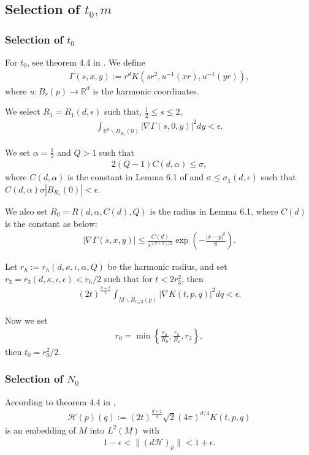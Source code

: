 \subsection{Selection of \texorpdfstring{$t_0, m$}{t0, m}}

\subsubsection{Selection of \texorpdfstring{$t_0$}{t0}}
For $t_0$, see theorem 4.4 in \cite{portegies2016embeddings}.
We define 
\begin{align}
	\Gamma(s,x,y) := r^d K(sr^2, u^{-1}(xr),u^{-1}(yr)),
\end{align}
where $u : B_r(p) \rightarrow \mathbb{R}^d$ is the harmonic coordinates.

We select $R_1 = R_1(d,\epsilon)$ such that, $\frac{1}{2}\leq s \leq 2$, 
\begin{align}
	\int_{\mathbb{R}^d \backslash B_{R_1}(0)} |\nabla \Gamma(s,0,y)|^2 dy < \epsilon.
\end{align}

We set $\alpha=\frac{1}{2}$ and $Q>1$ such that 
\begin{align}
	2(Q-1)C(d,\alpha) \leq \sigma,
\end{align}
where $C(d,\alpha)$ is the constant in Lemma 6.1 of \cite{portegies2016embeddings} and $\sigma \leq \sigma_1(d,\epsilon)$ such that $C(d,\alpha)\sigma |B_{R_1}(0)| < \epsilon$.

We also set $R_0=R(d,\alpha, C(d),Q)$ is the radius in Lemma 6.1, where $C(d)$ is the constant as below:
\begin{align}
	|\nabla\Gamma(s,x,y)| \leq \frac{C(d)}{s^{(d+1)/2}}\exp\left(-\frac{|x-y|^2}{8}\right).
\end{align}

Let $r_h := r_h(d,\kappa,\iota,\alpha,Q)$ be the harmonic radius, and set $r_3 = r_3(d,\kappa,\iota,\epsilon)< r_h/2$ such that for $t< 2r_3^2$, then
\begin{align}
	(2t)^{\frac{d+2}{2}}\int_{M\backslash B_{r_h/2}(p)}|\nabla K(t,p,q)|^2 dq <\epsilon.
\end{align}

Now we set 
\begin{align}
	r_0 = \min \left\{\frac{r_h}{R_0},\frac{r_h}{R_1},r_3\right\},
\end{align}
then $t_0 = r_0^2/2$.

\subsubsection{Selection of \texorpdfstring{$N_0$}{N0}}
According to theorem 4.4 in \cite{portegies2016embeddings}, 
\begin{align}
	\mathcal{H}(p)(q):= (2t)^{\frac{d+2}{4}}\sqrt{2}(4\pi)^{d/4} K(t,p,q)
\end{align}
is an embedding of $M$ into $L^2(M)$ with 
\begin{align}
	1-\epsilon < \|(d\mathcal{H})_p\|<1+\epsilon.
\end{align}

